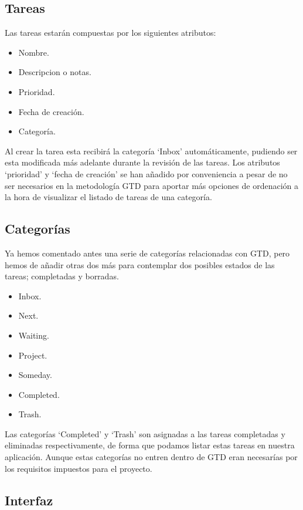 \documentclass[parskip=half*]{scrartcl}
\begin{document}
\subsection{Tareas}

Las tareas estar\'an compuestas por los siguientes atributos:
\begin{itemize}
	\item Nombre.
	\item Descripcion o notas.
	\item Prioridad.
	\item Fecha de creaci\'on.
	\item Categor\'ia.
\end{itemize}

Al crear la tarea esta recibir\'a la categor\'ia `Inbox' autom\'aticamente, pudiendo ser esta modificada m\'as adelante durante la revisi\'on de las tareas. Los atributos `prioridad' y `fecha de creaci\'on' se han a\~nadido por conveniencia a pesar de no ser necesarios en la metodolog\'ia GTD para aportar m\'as opciones de ordenaci\'on a la hora de visualizar el listado de tareas de una categor\'ia.

\subsection{Categor\'ias}

Ya hemos comentado antes una serie de categor\'ias relacionadas con GTD, pero hemos de a\~nadir otras dos m\'as para contemplar dos posibles estados de las tareas; completadas y borradas.

\begin{itemize}
	\item Inbox.
	\item Next.
	\item Waiting.
	\item Project.
	\item Someday.
	\item Completed.
	\item Trash. 
\end{itemize}

Las categor\'ias `Completed' y `Trash' son asignadas a las tareas completadas y eliminadas respectivamente, de forma que podamos listar estas tareas en nuestra aplicaci\'on. Aunque estas categor\'ias no entren dentro de GTD eran necesar\'ias por los requisitos impuestos para el proyecto.

\subsection{Interfaz}
\end{document}
